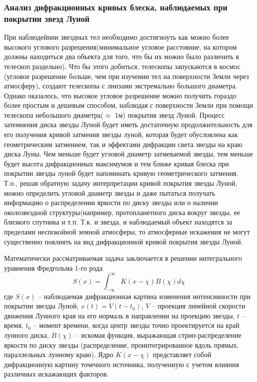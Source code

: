 \documentclass[12pt, a4paper]{article}
\begin{document}
	\subsubsection*{Анализ дифракционных кривых блеска, наблюдаемых при покрытии звезд Луной}
	При наблюдейнии звездных тел необходимо достигноуть как можно более высокого углового разрешения(минимальное угловое расстояние, на котором должны находиться два объекта для того, что бы их можно было различить в телескоп раздельно). Что бы этого добиться, телескопы запускаются в космос (угловое разрешение больше, чем при изучении тел на поверхности Земли через атмосферу), создают телескопы с линзами экстремально большого диаметра. Однако оказалось, что высокое угловое разрешение можно получить гораздо более простым и дешевым способом, наблюдая с поверхности Земли при помощи телескопа небольшого диаметра($\approx$ 1м) покрытия звезд Луной. Процесс затемнения диска звезды Луной будет иметь достаточную продолжительность для его получения кривой затмения звезды луной, которая будет обусловлена как геометрическим затмением, так и эффектами дифракции света звезды на краю диска Луны. Чем меньше будет угловой диаметр затмеваемой звезды, тем меньше будет высота дифракционных максимумов и тем ближе кривая блеска при покрытии звезды луной будет напоминать кривую геометрического затмения. Т.о., решая обратную задачу интерпретации кривой покрытия звезды Луной, можно определить угловой диаметр звезды и даже пытаться получать информацию о распределении яркости по диску звезды или о наличии околозвездной структуры(например, протопланетного диска вокруг звезды, ее близкого спутника и т.п. Т.к. и звезда, и наблюдаемый объект находятся за пределами неспокойной земной атмосферы, то атмосферные искажения не могут существенно повлиять на вид дифракционной кривой покрытия звезды Луной.  
	
	Математически рассматриваемая задача заключается в решении интегрального уравнения Фредгольма 1-го рода
	$$
	S(x)=\int^{\infty}_{-\infty} K(x-\chi)B(\chi) d\chi
	$$
	где $S(x)$ – наблюдаемая дифракционная картина изменения интенсивности при покрытии звезды Луной, $x(t)=V(t-t_0)$, $V$ – проекция линейной скорости движения Лунного края на его нормаль в направлении на проекцию звезды, $t$ – время, $t_0$ – момент времени, когда центр звезды точно проектируется на край лунного диска, $B(\chi)$ – искомая функция, выражающая стрип-распределение яркости по диску звезды (распределение, проинтегрированное вдоль прямых, параллельных лунному краю). Ядро $K(x-\chi)$ представляет собой дифракционную картину точечного источника, полученную с учетом влияния различных искажающих факторов.
	
\end{document}
